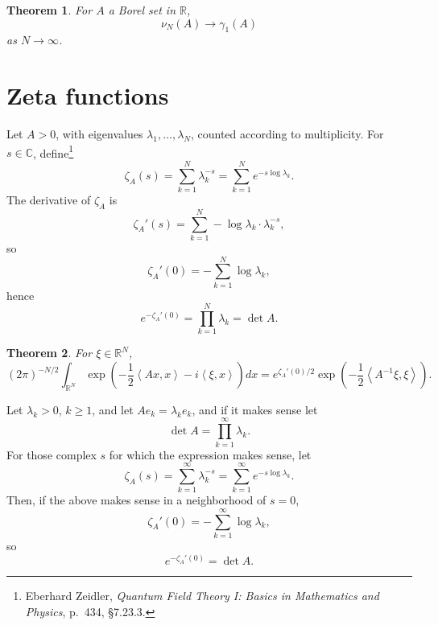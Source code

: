\documentclass{article}
\newcommand{\inner}[2]{\left\langle #1, #2 \right\rangle}
\newtheorem{theorem}{Theorem}
\theoremstyle{definition}
\begin{document}
\begin{theorem}
For $A$ a Borel set in $\mathbb{R}$,
\[
\nu_N(A) \to \gamma_1(A)
\]
as $N \to \infty$. 
\end{theorem}






\section{Zeta functions}
Let $A>0$, with eigenvalues
 $\lambda_1,
\ldots,\lambda_N$, counted according to multiplicity.
For $s \in \mathbb{C}$, define\footnote{Eberhard Zeidler,
{\em Quantum Field Theory I: Basics in Mathematics and Physics},
p.~434, \S 7.23.3.}
\[
\zeta_A(s) = \sum_{k=1}^N \lambda_k^{-s} = \sum_{k=1}^N e^{-s \log \lambda_k}.
\]
The derivative of $\zeta_A$ is
\[
\zeta_A'(s) = \sum_{k=1}^N -\log \lambda_k \cdot \lambda_k^{-s},
\]
so
\[
\zeta_A'(0) = - \sum_{k=1}^N \log \lambda_k,
\]
hence
\[
e^{-\zeta_A'(0)} = \prod_{k=1}^N \lambda_k = \det A.
\]

\begin{theorem}
For $\xi \in \mathbb{R}^N$,
\[
(2\pi)^{-N/2} \int_{\mathbb{R}^N}  \exp\left(-\frac{1}{2} \inner{Ax}{x} - i\inner{\xi}{x} \right) dx
=e^{\zeta_A'(0)/2}  \exp\left( -\frac{1}{2} \inner{A^{-1} \xi}{\xi} \right).
\]
\end{theorem}

Let $\lambda_k>0$, $k \geq 1$, and
let $Ae_k = \lambda_k e_k$, and if it makes sense let
\[
\det A = \prod_{k=1}^\infty \lambda_k.
\]
For those complex $s$ for which the expression makes sense,
let
\[
\zeta_A(s) = \sum_{k=1}^\infty \lambda_k^{-s} = \sum_{k=1}^\infty e^{-s \log \lambda_k}.
\]
Then, if the above makes sense in a neighborhood of $s=0$,
\[
\zeta_A'(0) =  - \sum_{k=1}^\infty \log \lambda_k,
\]
so
\[
e^{-\zeta_A'(0)} = \det A.
\]
\end{document}
